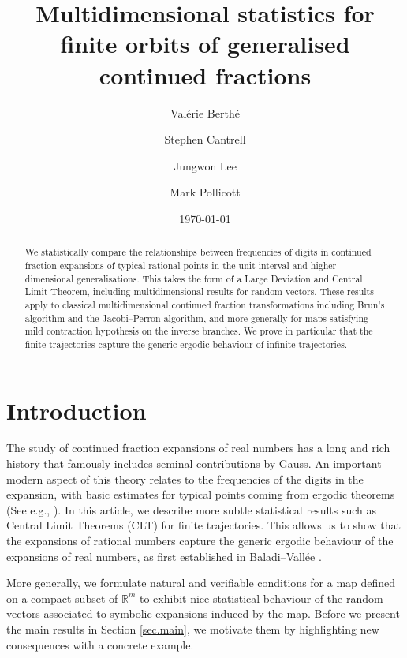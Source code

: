 \documentclass[12pt,a4paper,reqno]{amsart}
\date{\today}
\author{Val\'erie Berth\'e}
\author{Stephen Cantrell}
\author{Jungwon Lee}
\author{Mark Pollicott}
\title[Multidimensional statistics for generalised continued fractions]{Multidimensional statistics for finite orbits of generalised continued fractions}
\begin{document}
\maketitle

\begin{abstract}
We statistically compare the relationships between frequencies of digits in continued fraction expansions of typical rational points in the unit interval and higher dimensional generalisations. This takes the form of a Large Deviation and Central Limit Theorem, including multidimensional  results for random vectors. These results apply to classical  multidimensional  continued fraction transformations including  Brun's algorithm  and the Jacobi--Perron algorithm,  and more generally for maps    satisfying  mild contraction hypothesis on the inverse branches. We prove in  particular
that  the finite trajectories capture the generic ergodic  behaviour of  infinite trajectories. 
\end{abstract}


\section{Introduction}

The study of continued fraction expansions of  real numbers has a long and rich history that famously includes seminal contributions by Gauss.  An important modern aspect of this theory relates to the frequencies of the digits in the expansion, with basic estimates for typical points coming from  ergodic theorems  (See  e.g., \cite{HensleyBook}).  In this article, we describe more subtle statistical results such as Central Limit Theorems (CLT) for finite  trajectories. This allows us to show that the  expansions of  rational  numbers  capture the generic ergodic behaviour of the expansions of real numbers, as  first established in Baladi--Vallée \cite{baladi-vallee}.

More generally, we formulate natural and verifiable conditions  for a map defined on a compact subset of ${\mathbb R}^m$  to exhibit nice statistical behaviour of the random vectors associated to symbolic expansions induced by the map. Before we present the main results in Section \ref{sec.main}, we motivate them by highlighting new consequences with a concrete example. 
\end{document}
